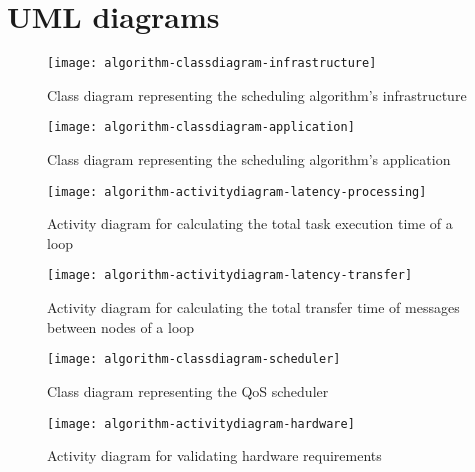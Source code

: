 \clearpage
\appendix

\chapter{UML diagrams\label{cha:algorithm-UML-diagrams}}

\begin{figure}[htb]
    \centering
    \texttt{[image: algorithm-classdiagram-infrastructure]}
    \caption{Class diagram representing the scheduling algorithm's infrastructure}
    \label{fig:classdiagram-infrastructure}
\end{figure}

\begin{figure}[htb]
    \centering
    \texttt{[image: algorithm-classdiagram-application]}
    \caption{Class diagram representing the scheduling algorithm's application}
    \label{fig:classdiagram-application}
\end{figure}

\begin{figure}[htb]
    \centering
    \texttt{[image: algorithm-activitydiagram-latency-processing]}
    \caption{Activity diagram for calculating the total task execution time of a loop}
    \label{fig:algorithm-activitydiagram-latency-processing}
\end{figure}

\begin{figure}[htb]
    \centering
    \texttt{[image: algorithm-activitydiagram-latency-transfer]}
    \caption{Activity diagram for calculating the total transfer time of messages between nodes of a loop}
    \label{fig:algorithm-activitydiagram-latency-transfer}
\end{figure}



\begin{figure}[htb]
    \centering
    \texttt{[image: algorithm-classdiagram-scheduler]}
    \caption{Class diagram representing the QoS scheduler}
    \label{fig:classdiagram-qosscheduler}
\end{figure}

\begin{figure}[htb]
    \centering
    \texttt{[image: algorithm-activitydiagram-hardware]}
    \caption{Activity diagram for validating hardware requirements}
    \label{fig:algorithm-activitydiagram-hardware}
\end{figure}


